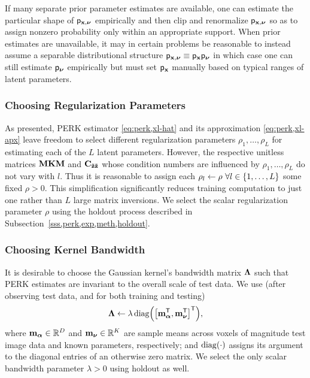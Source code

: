 If many separate prior parameter estimates are available,
one can estimate the particular shape 
of $\mathsf{p}_{\mathbf{x},\boldsymbol{\nu}}$ empirically 
and then clip and renormalize $\mathsf{p}_{\mathbf{x},\boldsymbol{\nu}}$
so as to assign nonzero probability
only within an appropriate support.
When prior estimates are unavailable,
it may in certain problems be reasonable 
to instead assume
a separable distributional structure
$\mathsf{p}_{\mathbf{x},\boldsymbol{\nu}} \equiv \mathsf{p}_{\mathbf{x}}\mathsf{p}_{\boldsymbol{\nu}}$
in which case
one can still estimate $\mathsf{p}_{\boldsymbol{\nu}}$ empirically
but must set $\mathsf{p}_{\mathbf{x}}$ manually
based on typical ranges
of latent parameters.

\subsubsection{Choosing Regularization Parameters}
\label{sss,perk,pract,mod,reg}

As presented,
PERK estimator \eqref{eq:perk,xl-hat}
and its approximation \eqref{eq:perk,xl-apx}
leave freedom to select different regularization parameters
$\rho_1,\dots,\rho_L$
for estimating each of the $L$ latent parameters.
However,
the respective unitless matrices 
$\mathbf{M}\mathbf{K}\mathbf{M}$ and $\mathbf{C_{\tilde{\mathbf{z}}\tilde{\mathbf{z}}}}$ 
whose condition numbers are influenced 
by $\rho_1,\dots,\rho_L$
do not vary with $l$.
Thus it is reasonable 
to assign each $\rho_l \gets \rho\,\, \forall l \in \set{1,\dots,L}$ 
some fixed $\rho > 0$.
This simplification significantly reduces training computation
to just one
rather than $L$
large matrix inversions.
We select the scalar regularization parameter $\rho$
using the holdout process 
described in Subsection~\ref{sss,perk,exp,meth,holdout}.

\subsubsection{Choosing Kernel Bandwidth}
\label{sss,perk,pract,mod,length}

It is desirable 
to choose the Gaussian kernel's bandwidth matrix $\boldsymbol{\Lambda}$ 
such that PERK estimates are invariant 
to the overall scale of test data. 
We use
(after observing test data,
and for both training and testing)
\begin{align}
	\bmL \gets \lambda \diag{\brac{\bmmybar\tpose, \bmmnu\tpose}\tpose},
	\label{eq:perk,bw}
\end{align}
where 
$\mathbf{m}_{\boldsymbol{\alpha}} \in \mathbb{R}^{D}$ 
and 
$\mathbf{m}_{\boldsymbol{\nu}} \in \mathbb{R}^{K}$
are sample means across voxels
of magnitude test image data
and known parameters,
respectively;
and $\diag{\cdot}$ assigns its argument 
to the diagonal entries
of an otherwise zero matrix.
We select the
only scalar bandwidth parameter $\lambda>0$
using holdout as well.

